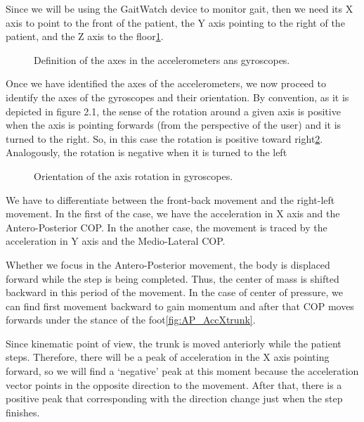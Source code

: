 Since we will be using the GaitWatch device to monitor gait, then we need its X axis to point to the front of the patient, the Y axis pointing to the right  of the patient, and the Z axis to the floor\ref{fig:axesGW}.\cite{OlivaresBotzel2013}

\begin{figure}[H]
	\centering
	\caption{Definition of the axes in the accelerometers ans gyroscopes.}
	\label{fig:axesGW}
\end{figure}

Once we have identified the axes of the accelerometers, we now proceed to identify the axes of the gyroscopes and their orientation. By convention, as it is depicted in figure 2.1, the sense of the rotation around a given axis is positive when the axis is pointing forwards (from the perspective of the user) and it is turned to the right. So, in this case the rotation is positive toward right\ref{fig:axesGWGyro}. Analogously, the rotation is negative when it is turned to the left  \cite{OlivaresBotzel2013}

\begin{figure}[H]
	\centering
	\caption{Orientation of the axis rotation in gyroscopes.}
	\label{fig:axesGWGyro}
\end{figure}


We have to differentiate between the front-back movement and the right-left movement. In the first of the case, we have the acceleration in X axis and the Antero-Posterior COP. In the another case, the movement is traced by the acceleration in Y axis and the Medio-Lateral  COP.

Whether we focus in the Antero-Posterior movement, the body is displaced forward while the step is being completed. Thus, the center of mass is shifted backward in this period of the movement. In the case of center of pressure, we can find first  movement backward to gain momentum and after that  COP moves forwards under the stance of the foot\ref{fig:AP_AccXtrunk}.

Since kinematic point of view, the trunk is moved anteriorly while the patient steps. Therefore, there will be a peak of acceleration in the X axis pointing forward, so we will find a ‘negative’ peak at this moment because the acceleration vector points in the opposite direction to the movement. After that, there is a positive peak that corresponding with the direction change just when the step finishes. 

